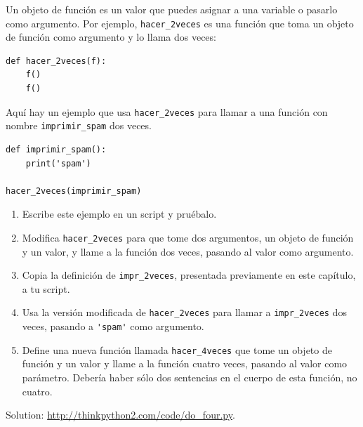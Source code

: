 \documentclass[10pt]{book}
\begin{document}
\begin{exercise}

Un objeto de función es un valor que puedes asignar a una variable o
pasarlo como argumento.  Por ejemplo, \verb"hacer_2veces" es una función
que toma un objeto de función como argumento y lo llama dos veces:

\begin{verbatim}
def hacer_2veces(f):
    f()
    f()
\end{verbatim}

Aquí hay un ejemplo que usa \verb"hacer_2veces" para llamar a una función
con nombre \verb"imprimir_spam" dos veces.

\begin{verbatim}
def imprimir_spam():
    print('spam')

hacer_2veces(imprimir_spam)
\end{verbatim}

\begin{enumerate}

\item Escribe este ejemplo en un script y pruébalo.

\item Modifica \verb"hacer_2veces" para que tome dos argumentos, un
objeto de función y un valor, y llame a la función dos veces,
pasando al valor como argumento.

\item Copia la definición de
\verb"impr_2veces", presentada previamente en este capítulo, a tu script.

\item Usa la versión modificada de \verb"hacer_2veces" para llamar a
\verb"impr_2veces" dos veces, pasando a \verb"'spam'" como argumento.

\item Define una nueva función llamada
\verb"hacer_4veces" que tome un objeto de función y un valor
y llame a la función cuatro veces, pasando al valor
como parámetro.  Debería haber sólo
dos sentencias en el cuerpo de esta función, no cuatro.

\end{enumerate}

Solution: \url{http://thinkpython2.com/code/do_four.py}.

\end{exercise}
\end{document}
